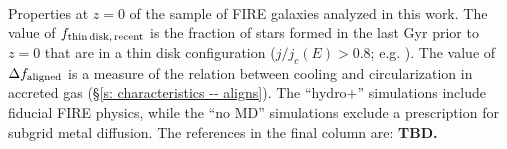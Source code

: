 \documentclass[fleqn,usenatbib]{mnras}
\begin{document}
\begin{table}
\begin{tabular}{cccccccc}
   \\
\end{tabular}
\\
\begin{flushleft}
Properties at $z=0$ of the sample of FIRE galaxies analyzed in this work.
The value of $f_{\rm thin\,disk,\,recent}$ is the fraction of stars formed in the last Gyr prior to $z=0$ that are in a thin disk configuration ($j/j_c(E) > 0.8$; e.g. \citealt{Yu2021}).
The value of $\Delta f_{\rm aligned}$ is a measure of the relation between cooling and circularization in accreted gas (\S\ref{s: characteristics -- aligns}).
The ``hydro+'' simulations include fiducial FIRE physics, while the ``no MD'' simulations exclude a prescription for subgrid metal diffusion.
The references in the final column are:
\textbf{TBD.}
\end{flushleft}
\label{table: simulations_used}
\end{table}

\end{document}

